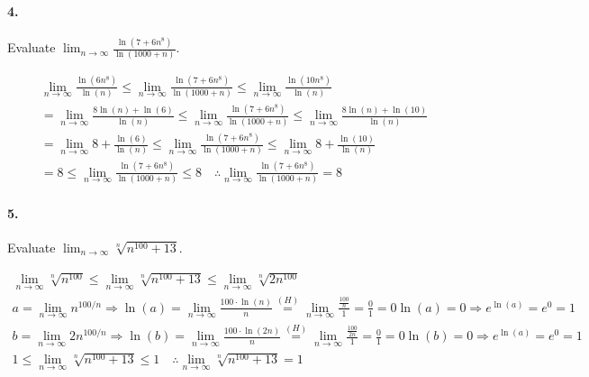     \paragraph*{4.}
    Evaluate $\lim_{n \to \infty}\frac{\ln(7+6n^{8})}{\ln(1000+n)}$.
    \\
    \begin{mdframed}
        \begin{equation*}
            \begin{gathered}
                \lim_{n \to \infty}\frac{\ln(6n^{8})}{\ln(n)}   \leq
                \lim_{n \to \infty}\frac{\ln(7+6n^{8})}{\ln(1000+n)} \leq
                \lim_{n \to \infty}\frac{\ln(10n^{8})}{\ln(n)}   \\
                = \lim_{n \to \infty}\frac{8\ln(n) + \ln(6)}{\ln(n)}   \leq
                \lim_{n \to \infty}\frac{\ln(7+6n^{8})}{\ln(1000+n)} \leq
                \lim_{n \to \infty}\frac{8\ln(n) + \ln(10)}{\ln(n)}   \\
                = \lim_{n \to \infty}8 + \frac{\ln(6)}{\ln(n)}\leq
                \lim_{n \to \infty}\frac{\ln(7+6n^{8})}{\ln(1000+n)} \leq
                \lim_{n \to \infty}8 + \frac{\ln(10)}{\ln(n)}   \\
                = 8 \leq
                \lim_{n \to \infty}\frac{\ln(7+6n^{8})}{\ln(1000+n)} \leq
                8 \quad \therefore \lim_{n \to \infty}\frac{\ln(7+6n^{8})}{\ln(1000+n)} = \boxed{8}
            \end{gathered}
        \end{equation*}
    \end{mdframed}

    \paragraph*{5.}
    Evaluate $\lim_{n \to \infty}\sqrt[n]{n^{100}+13}$.
    \\
    \begin{mdframed}
        \begin{equation*}
            \begin{gathered}
                \lim_{n \to \infty}\sqrt[n]{n^{100}} \leq
                \lim_{n \to \infty}\sqrt[n]{n^{100}+13} \leq
                \lim_{n \to \infty}\sqrt[n]{2n^{100}}   \\
                a=\lim_{n \to \infty}n^{100/n} \Rightarrow \ln(a)=\lim_{n \to \infty}\frac{100\cdot\ln(n)}{n}
                \stackrel{(H)}{=}\lim_{n \to \infty}\frac{\frac{100}{n}}{1} = \frac{0}{1} = 0 \ln(a) = 0 \Rightarrow e^{\ln(a)} = e^{0} = 1 \\
                b=\lim_{n \to \infty}2n^{100/n} \Rightarrow \ln(b)=\lim_{n \to \infty}\frac{100\cdot\ln(2n)}{n}
                \stackrel{(H)}{=}\lim_{n \to \infty}\frac{\frac{100}{2n}}{1} = \frac{0}{1} = 0 \ln(b) = 0 \Rightarrow e^{\ln(a)} = e^{0} = 1 \\
                1 \leq
                \lim_{n \to \infty}\sqrt[n]{n^{100}+13} \leq
                1 \quad \therefore \lim_{n \to \infty}\sqrt[n]{n^{100}+13} = \boxed{1}
            \end{gathered}
        \end{equation*}
    \end{mdframed}

